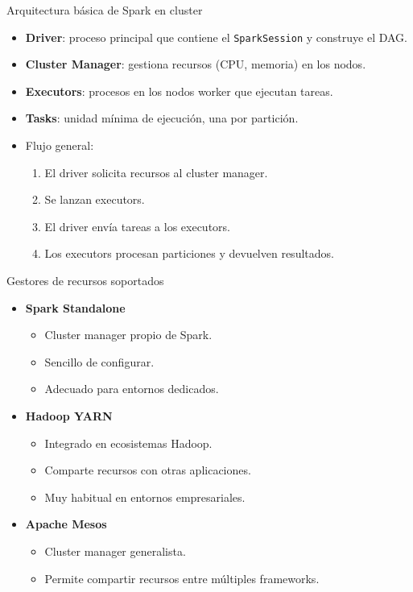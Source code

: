 \documentclass{beamer}
\begin{document}
\begin{frame}{Arquitectura básica de Spark en cluster}
\begin{itemize}
  \item \textbf{Driver}: proceso principal que contiene el \texttt{SparkSession} y construye el DAG.
  \item \textbf{Cluster Manager}: gestiona recursos (CPU, memoria) en los nodos.
  \item \textbf{Executors}: procesos en los nodos worker que ejecutan tareas.
  \item \textbf{Tasks}: unidad mínima de ejecución, una por partición.
  \item Flujo general:
  \begin{enumerate}
    \item El driver solicita recursos al cluster manager.
    \item Se lanzan executors.
    \item El driver envía tareas a los executors.
    \item Los executors procesan particiones y devuelven resultados.
  \end{enumerate}
\end{itemize}
\end{frame}

\begin{frame}{Gestores de recursos soportados}
\begin{itemize}
  \item \textbf{Spark Standalone}
  \begin{itemize}
    \item Cluster manager propio de Spark.
    \item Sencillo de configurar.
    \item Adecuado para entornos dedicados.
  \end{itemize}
  \item \textbf{Hadoop YARN}
  \begin{itemize}
    \item Integrado en ecosistemas Hadoop.
    \item Comparte recursos con otras aplicaciones.
    \item Muy habitual en entornos empresariales.
  \end{itemize}
  \item \textbf{Apache Mesos}
  \begin{itemize}
    \item Cluster manager generalista.
    \item Permite compartir recursos entre múltiples frameworks.
  \end{itemize}
\end{itemize}
\end{frame}
\end{document}
